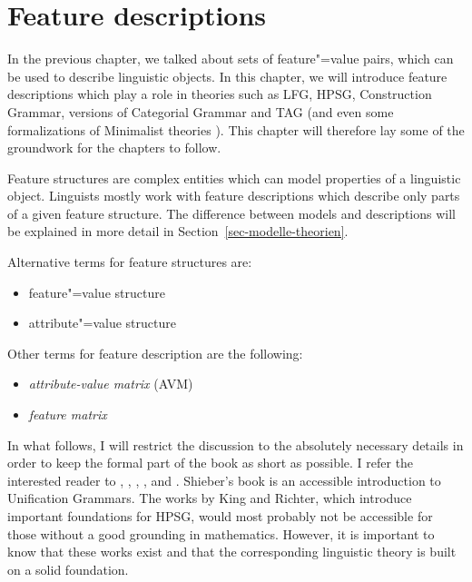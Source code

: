 




\chapter{Feature descriptions}
\label{chap-feature-descriptions}\label{chap-avm}

In the previous chapter, we talked about sets of feature"=value pairs, which can be used to describe linguistic objects. In this chapter, we will introduce
feature descriptions which play a role in theories such as LFG, HPSG, Construction Grammar, versions of Categorial Grammar and TAG (and even some
formalizations of Minimalist theories \citep{Veenstra98a}). This chapter will therefore lay some of the groundwork for the chapters to follow.


Feature structures are complex entities which can model properties of a linguistic object. 
Linguists mostly work with feature descriptions which describe only parts of a given feature
structure. The difference between models and descriptions will be explained
in more detail in Section~\ref{sec-modelle-theorien}.

Alternative terms for feature structures are:
\begin{itemize}
\item feature"=value structure
\item attribute"=value structure
\end{itemize}
Other terms for feature description are the following:
\begin{itemize}
\item \emph{attribute-value matrix} (AVM)
\item \emph{feature matrix}
\end{itemize}
In what follows, I will restrict the discussion to the absolutely necessary details in order to keep
the formal part of the book as short as possible. I refer the interested reader to
\citet{Shieber86a}, \citet[Chapter~2]{ps}, \citet{Johnson88}, \citet{Carpenter92a}, \citet{King94a}
and \citet{Richter2004a-u,Richter2021a}. Shieber's book is an accessible introduction to Unification
Grammars. The works by King and Richter, which introduce important foundations for HPSG, would most
probably not be accessible for those without a good grounding in mathematics. However, it is
important to know that these works exist and that the corresponding linguistic theory is built on a
solid foundation. 

